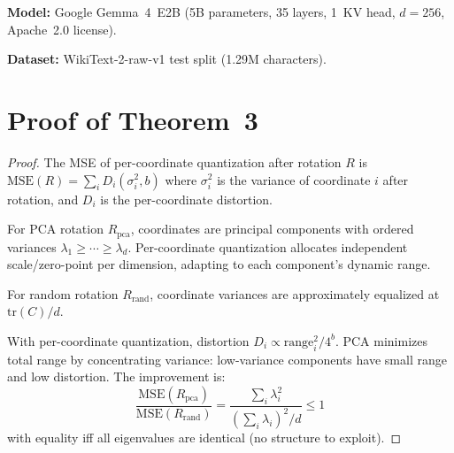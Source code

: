 \documentclass[10pt,twocolumn]{article}
\begin{document}
\textbf{Model:} Google Gemma~4~E2B (5B parameters, 35 layers, 1~KV head, $d{=}256$, Apache~2.0 license).

\textbf{Dataset:} WikiText-2-raw-v1 \citep{merity2017pointer} test split (1.29M characters).

\section{Proof of Theorem~3}

\begin{proof}
The MSE of per-coordinate quantization after rotation $R$ is $\text{MSE}(R) = \sum_i D_i(\sigma_i^2, b)$ where $\sigma_i^2$ is the variance of coordinate $i$ after rotation, and $D_i$ is the per-coordinate distortion.

For PCA rotation $R_{\text{pca}}$, coordinates are principal components with ordered variances $\lambda_1 \geq \cdots \geq \lambda_d$. Per-coordinate quantization allocates independent scale/zero-point per dimension, adapting to each component's dynamic range.

For random rotation $R_{\text{rand}}$, coordinate variances are approximately equalized at $\text{tr}(C)/d$.

With per-coordinate quantization, distortion $D_i \propto \text{range}_i^2 / 4^b$. PCA minimizes total range by concentrating variance: low-variance components have small range and low distortion. The improvement is:
\begin{equation}
\frac{\text{MSE}(R_{\text{pca}})}{\text{MSE}(R_{\text{rand}})} = \frac{\sum_i \lambda_i^2}{\left(\sum_i \lambda_i\right)^2 / d} \leq 1
\end{equation}
with equality iff all eigenvalues are identical (no structure to exploit).
\end{proof}



\end{document}
